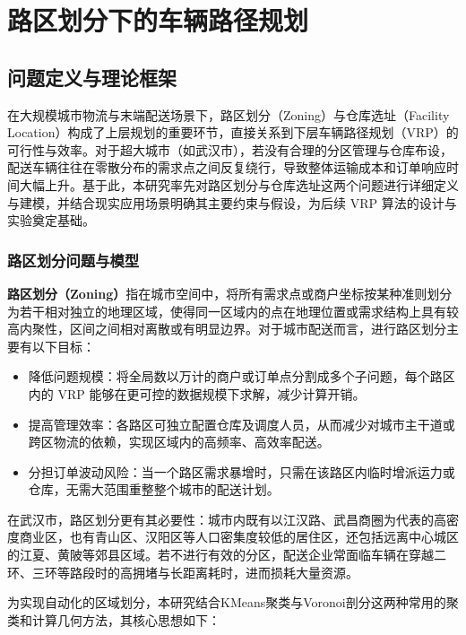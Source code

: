 \documentclass[12pt,a4paper,twoside]{ctexbook}
\let\oldchapter\chapter
\renewcommand{\chapter}{\clearpage\oldchapter}  %
\begin{document}
\chapter{路区划分下的车辆路径规划}

\section{问题定义与理论框架}

在大规模城市物流与末端配送场景下，路区划分（Zoning）与仓库选址（Facility Location）构成了上层规划的重要环节，直接关系到下层车辆路径规划（VRP）的可行性与效率\cite{1}。对于超大城市（如武汉市），若没有合理的分区管理与仓库布设，配送车辆往往在零散分布的需求点之间反复绕行，导致整体运输成本和订单响应时间大幅上升。基于此，本研究率先对路区划分与仓库选址这两个问题进行详细定义与建模，并结合现实应用场景明确其主要约束与假设，为后续 VRP 算法的设计与实验奠定基础。

\subsection{路区划分问题与模型}

\textbf{路区划分（Zoning）}指在城市空间中，将所有需求点或商户坐标按某种准则划分为若干相对独立的地理区域，使得同一区域内的点在地理位置或需求结构上具有较高内聚性，区间之间相对离散或有明显边界\cite{2}。对于城市配送而言，进行路区划分主要有以下目标：

\begin{itemize}
\item 降低问题规模：将全局数以万计的商户或订单点分割成多个子问题，每个路区内的 VRP 能够在更可控的数据规模下求解，减少计算开销。

\item 提高管理效率：各路区可独立配置仓库及调度人员，从而减少对城市主干道或跨区物流的依赖，实现区域内的高频率、高效率配送。

\item 分担订单波动风险：当一个路区需求暴增时，只需在该路区内临时增派运力或仓库，无需大范围重整整个城市的配送计划\cite{3}。
\end{itemize}

在武汉市，路区划分更有其必要性：城市内既有以江汉路、武昌商圈为代表的高密度商业区，也有青山区、汉阳区等人口密集度较低的居住区，还包括远离中心城区的江夏、黄陂等郊县区域。若不进行有效的分区，配送企业常面临车辆在穿越二环、三环等路段时的高拥堵与长距离耗时，进而损耗大量资源。

为实现自动化的区域划分，本研究结合KMeans聚类与Voronoi剖分这两种常用的聚类和计算几何方法，其核心思想如下：
\end{document}
